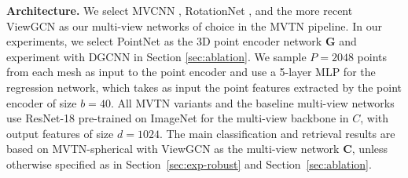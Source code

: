 \documentclass[10pt,twocolumn,letterpaper]{article}
\newcommand{\secLabel}{Section~}
\newcommand{\mysection}[1]{\noindent\textbf{#1.}}
\begin{document}
\begin{table}[t]
\tabcolsep=0.07cm
    \centering
{}
\vspace{2pt}
    \caption{\textbf{3D Shape Retrieval}. We benchmark the shape retrieval mAP of  MVTN on ModelNet40 \cite{modelnet} and ShapeNet Core55 \cite{shapenet,shrek17}. MVTN achieves the best retrieval performance among recent state-of-the-art methods on both datasets with only 12 views.}
     \label{tab:retrieval}
\end{table}

\mysection{Architecture}
We select MVCNN \cite{mvcnn}, RotationNet \cite{mvrotationnet}, and the more recent ViewGCN \cite{mvviewgcn} as our multi-view networks of choice in the MVTN pipeline.
In our experiments, we select PointNet \cite{pointnet} as the 3D point encoder network $\mathbf{G}$ and experiment with DGCNN in Section \ref{sec:ablation}.
We sample $P = 2048$ points from each mesh as input to the point encoder and use a 5-layer MLP for the regression network, which takes as input the point features extracted by the point encoder of size $b=40$.
All MVTN variants and the baseline multi-view networks use ResNet-18 \cite{resnet} pre-trained on ImageNet \cite{IMAGENET} for the multi-view backbone in $C$, with output features of size $d=1024$. The main classification and retrieval results are based on MVTN-spherical with ViewGCN \cite{mvviewgcn} as the multi-view network $\mathbf{C}$, unless otherwise specified as in \secLabel{\ref{sec:exp-robust}} and \secLabel{\ref{sec:ablation}}. 
\end{document}
